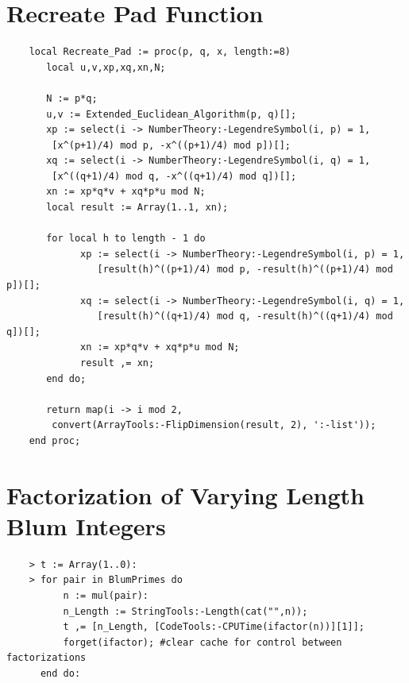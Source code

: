 \documentclass{article}
\begin{document}
\section{Recreate Pad Function}

\begin{verbatim}
    local Recreate_Pad := proc(p, q, x, length:=8)
       local u,v,xp,xq,xn,N;

       N := p*q;
       u,v := Extended_Euclidean_Algorithm(p, q)[];
       xp := select(i -> NumberTheory:-LegendreSymbol(i, p) = 1, 
        [x^(p+1)/4) mod p, -x^((p+1)/4) mod p])[];
       xq := select(i -> NumberTheory:-LegendreSymbol(i, q) = 1, 
        [x^((q+1)/4) mod q, -x^((q+1)/4) mod q])[];
       xn := xp*q*v + xq*p*u mod N;
       local result := Array(1..1, xn);

       for local h to length - 1 do
             xp := select(i -> NumberTheory:-LegendreSymbol(i, p) = 1, 
                [result(h)^((p+1)/4) mod p, -result(h)^((p+1)/4) mod p])[];
             xq := select(i -> NumberTheory:-LegendreSymbol(i, q) = 1, 
                [result(h)^((q+1)/4) mod q, -result(h)^((q+1)/4) mod q])[];
             xn := xp*q*v + xq*p*u mod N;
             result ,= xn;
       end do;

       return map(i -> i mod 2, 
        convert(ArrayTools:-FlipDimension(result, 2), ':-list'));
    end proc;
\end{verbatim}

\section{Factorization of Varying Length Blum Integers}
\begin{verbatim}
    > t := Array(1..0):
    > for pair in BlumPrimes do 
          n := mul(pair):
          n_Length := StringTools:-Length(cat("",n));
          t ,= [n_Length, [CodeTools:-CPUTime(ifactor(n))][1]];
          forget(ifactor); #clear cache for control between factorizations
      end do:
\end{verbatim}
\end{document}
